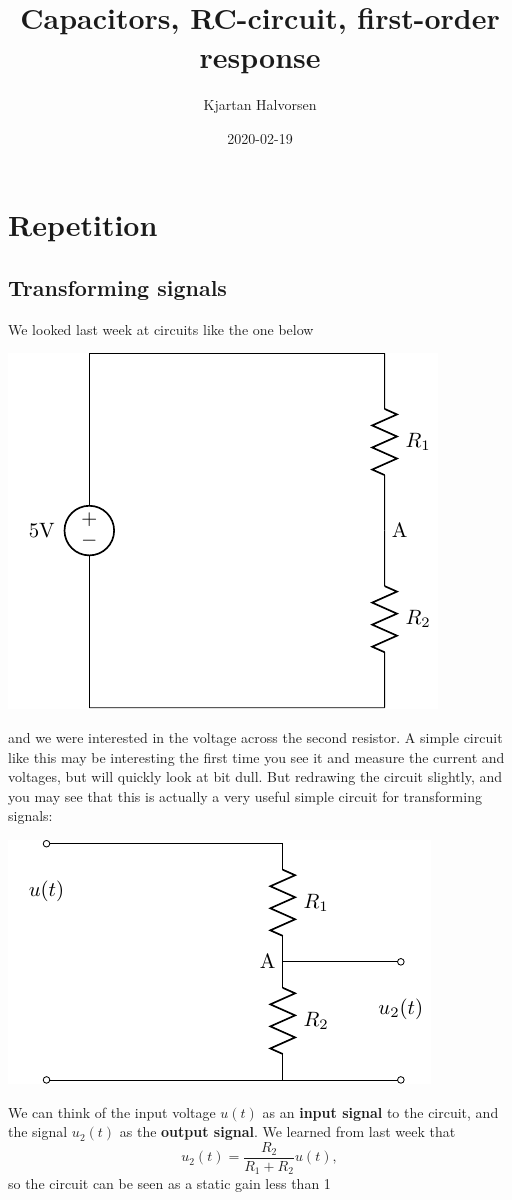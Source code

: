 \documentclass[a4paper]{scrartcl}
\author{Kjartan Halvorsen}
\date{2020-02-19}
\title{Capacitors, RC-circuit, first-order response}
\begin{document}
\maketitle


\section{Repetition}
\label{sec-1}
\subsection{Transforming signals}
\label{sec-1-1}
We looked last week at circuits like the one below
\begin{center}
\includegraphics[width=0.4\linewidth]{../../figures/voltage-divider-circuit}
\end{center}
and we were interested in the voltage across the second resistor. A simple circuit like this may be interesting the first time you see it and measure the current and voltages, but will quickly look at bit dull. But redrawing the circuit slightly, and you may see that this is actually a very useful simple circuit for transforming signals:
\begin{center}
\includegraphics[width=0.4\linewidth]{../../figures/voltage-divider-input-output}
\end{center}
We can think of the input voltage $u(t)$ as an \textbf{input signal} to the circuit, and the signal $u_2(t)$ as the \textbf{output signal}. We learned from last week that
\[ u_2(t) = \frac{R_2}{R_1+R_2}u(t),\]
so the circuit can be seen as a static gain less than 1
   \begin{center}
\end{center}
\end{document}
